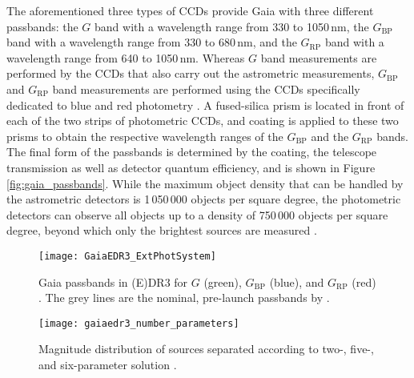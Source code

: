 \documentclass[a4paper,11pt]{article}
\begin{document}
The aforementioned three types of CCDs provide Gaia with three different passbands: the $G$ band with a wavelength range from 330 to 1050\,nm, the $G_\mathrm{BP}$ band with a wavelength range from 330 to 680\,nm, and the $G_\mathrm{RP}$ band with a wavelength range from 640 to 1050\,nm. Whereas $G$ band measurements are performed by the CCDs that also carry out the astrometric measurements, $G_\mathrm{BP}$ and $G_\mathrm{RP}$ band measurements are performed using the CCDs specifically dedicated to blue and red photometry \citep{evans18}. A fused-silica prism is located in front of each of the two strips of photometric CCDs, and coating is applied to these two prisms to obtain the respective wavelength ranges of the $G_\mathrm{BP}$ and the $G_\mathrm{RP}$ bands. The final form of the passbands is determined by the coating, the telescope transmission as well as detector quantum efficiency, and is shown in Figure \ref{fig:gaia_passbands}. While the maximum object density that can be handled by the astrometric detectors is 1\,050\,000 objects per square degree, the photometric detectors can observe all objects up to a density of 750\,000 objects per square degree, beyond which only the brightest sources are measured \citep{gaia}.
%
\begin{figure}
 \centering
 \begin{minipage}[t]{0.5\textwidth}
  \centering
  \texttt{[image: GaiaEDR3\_ExtPhotSystem]}
  \caption[Gaia EDR3 passbands]{Gaia passbands in (E)DR3 for $G$ (green), $G_\mathrm{BP}$ (blue), and $G_\mathrm{RP}$ (red) \citep{riello21}. The grey lines are the nominal, pre-launch passbands by \citet{jordi10}.}
  \label{fig:gaia_passbands}
 \end{minipage}\hfill
 \begin{minipage}[t]{0.47\textwidth}
  \centering
  \texttt{[image: gaiaedr3\_number\_parameters]}
  \caption[Gaia EDR3 number of parameters solved as function of $G$]{Magnitude distribution of sources separated according to two-, five-, and six-parameter solution \citep{lindegren21}.}
  \label{fig:gaia_solved_sources}
 \end{minipage}
\end{figure}\\ \\
%
\end{document}
